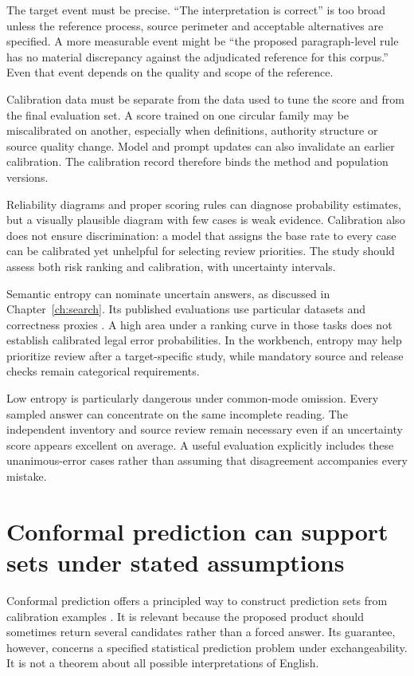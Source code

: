\documentclass[12pt,a4paper,oneside,openany]{book}
\begin{document}
The target event must be precise. ``The interpretation is correct'' is too broad
unless the reference process, source perimeter and acceptable alternatives are
specified. A more measurable event might be ``the proposed paragraph-level rule
has no material discrepancy against the adjudicated reference for this corpus.''
Even that event depends on the quality and scope of the reference.

Calibration data must be separate from the data used to tune the score and from
the final evaluation set. A score trained on one circular family may be
miscalibrated on another, especially when definitions, authority structure or
source quality change. Model and prompt updates can also invalidate an earlier
calibration. The calibration record therefore binds the method and population
versions.

Reliability diagrams and proper scoring rules can diagnose probability estimates,
but a visually plausible diagram with few cases is weak evidence. Calibration
also does not ensure discrimination: a model that assigns the base rate to every
case can be calibrated yet unhelpful for selecting review priorities. The study
should assess both risk ranking and calibration, with uncertainty intervals.

Semantic entropy can nominate uncertain answers, as discussed in
Chapter~\ref{ch:search}. Its published evaluations use particular datasets and
correctness proxies \citep{semantic2023}. A high area under a ranking curve in
those tasks does not establish calibrated legal error probabilities. In the
workbench, entropy may help prioritize review after a target-specific study, while
mandatory source and release checks remain categorical requirements.

Low entropy is particularly dangerous under common-mode omission. Every sampled
answer can concentrate on the same incomplete reading. The independent inventory
and source review remain necessary even if an uncertainty score appears excellent
on average. A useful evaluation explicitly includes these unanimous-error cases
rather than assuming that disagreement accompanies every mistake.

\section{Conformal prediction can support sets under stated assumptions}
\label{merge:M09:09}


Conformal prediction offers a principled way to construct prediction sets from
calibration examples \citep[section 1.1 and appendix D]{conformal2022}. It is
relevant because the proposed product should sometimes return several candidates
rather than a forced answer. Its guarantee, however, concerns a specified
statistical prediction problem under exchangeability. It is not a theorem about
all possible interpretations of English.
\end{document}
